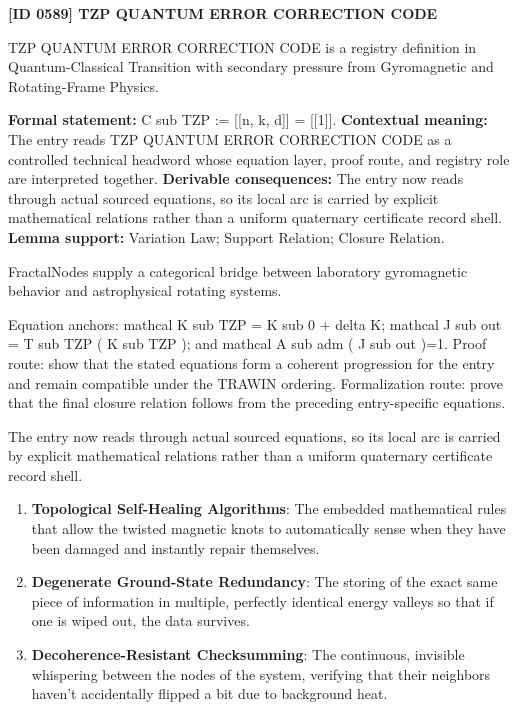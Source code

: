 \clearpage
\noindent\textbf{[ID 0589] TZP QUANTUM ERROR CORRECTION CODE}\par
\vspace{0.35em}
\begingroup\small
{}
TZP QUANTUM ERROR CORRECTION CODE is a registry definition in Quantum-Classical Transition with secondary pressure from Gyromagnetic and Rotating-Frame Physics.

\begingroup\footnotesize\setlength{\emergencystretch}{3em}\sloppy
\textbf{Formal statement:} C sub TZP := [[n, k, d]] = [[1]]. \textbf{Contextual meaning:} The entry reads TZP QUANTUM ERROR CORRECTION CODE as a controlled technical headword whose equation layer, proof route, and registry role are interpreted together. \textbf{Derivable consequences:} The entry now reads through actual sourced equations, so its local arc is carried by explicit mathematical relations rather than a uniform quaternary certificate record shell. \textbf{Lemma support:} Variation Law; Support Relation; Closure Relation.\par
\endgroup

FractalNodes supply a categorical bridge between laboratory gyromagnetic behavior and astrophysical rotating systems.

Equation anchors: mathcal K sub TZP = K sub 0 + delta K; mathcal J sub out = T sub TZP ( K sub TZP ); and mathcal A sub adm ( J sub out )=1. Proof route: show that the stated equations form a coherent progression for the entry and remain compatible under the TRAWIN ordering. Formalization route: prove that the final closure relation follows from the preceding entry-specific equations.

The entry now reads through actual sourced equations, so its local arc is carried by explicit mathematical relations rather than a uniform quaternary certificate record shell.
\endgroup

\begin{enumerate}[leftmargin=1.6em,itemsep=6pt,topsep=4pt]
\item \textbf{Topological Self-Healing Algorithms}: The embedded mathematical rules that allow the twisted magnetic knots to automatically sense when they have been damaged and instantly repair themselves.
\item \textbf{Degenerate Ground-State Redundancy}: The storing of the exact same piece of information in multiple, perfectly identical energy valleys so that if one is wiped out, the data survives.
\item \textbf{Decoherence-Resistant Checksumming}: The continuous, invisible whispering between the nodes of the system, verifying that their neighbors haven't accidentally flipped a bit due to background heat.
\end{enumerate}

